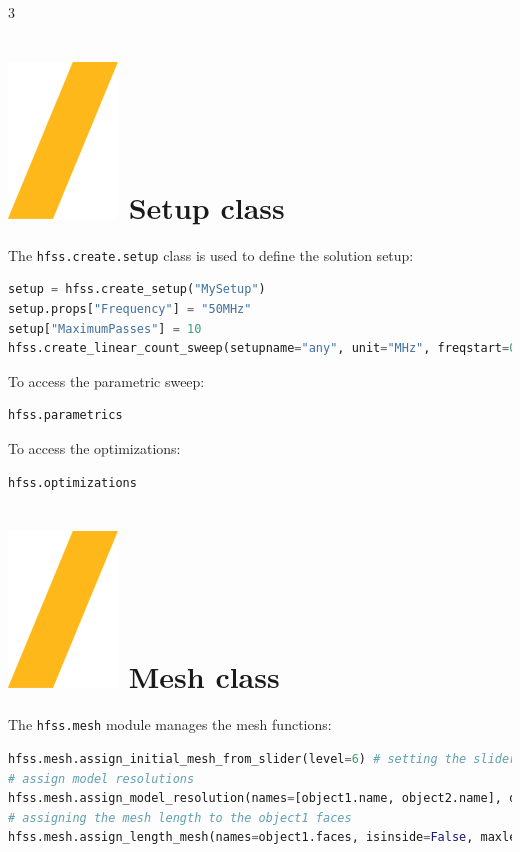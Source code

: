\documentclass[9pt,landscape]{article}
\begin{document}
\begin{multicols}{3}
\section{\includegraphics[height=\fontcharht\font`\S]{slash.png} Setup class}
The \texttt{hfss.create.setup} class is used to define the solution setup:

\begin{lstlisting}[language=Python]
setup = hfss.create_setup("MySetup")
setup.props["Frequency"] = "50MHz"
setup["MaximumPasses"] = 10
hfss.create_linear_count_sweep(setupname="any", unit="MHz", freqstart=0.1, freqstop=100, num_of_freq_points=100, sweepname="sweep1", sweep_type="Interpolating", save_fields=False)
\end{lstlisting}
To access the parametric sweep:
\begin{lstlisting}[language=Python]
hfss.parametrics
\end{lstlisting}
To access the optimizations:
\begin{lstlisting}[language=Python]
hfss.optimizations
\end{lstlisting}
\columnbreak
\section{\includegraphics[height=\fontcharht\font`\S]{slash.png} Mesh class}
The \texttt{hfss.mesh} module manages the mesh functions:
\begin{lstlisting}[language=Python]
hfss.mesh.assign_initial_mesh_from_slider(level=6) # setting the slider level to 6
# assign model resolutions
hfss.mesh.assign_model_resolution(names=[object1.name, object2.name], defeature_length=None)
# assigning the mesh length to the object1 faces
hfss.mesh.assign_length_mesh(names=object1.faces, isinside=False, maxlength=1, maxel=2000)
\end{lstlisting}


\end{multicols}
\end{document}
